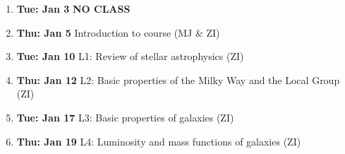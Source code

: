 \documentclass[10pt]{article}
\begin{document}
\vskip 0.2in
\begin{enumerate}
  \item {\bf Tue: Jan 3}  {\bf NO CLASS}
  \item {\bf Thu: Jan 5}   Introduction to course  (MJ \& ZI) 
  \item {\bf Tue: Jan 10}  L1: Review of stellar astrophysics (ZI)
  \item {\bf Thu: Jan 12}  L2: Basic properties of the Milky Way and the Local Group (ZI)
  \item {\bf Tue: Jan 17}  L3: Basic properties of galaxies (ZI)
 \item {\bf Thu: Jan 19}  L4: Luminosity and mass functions of galaxies (ZI)

\end{enumerate}
\end{document}
